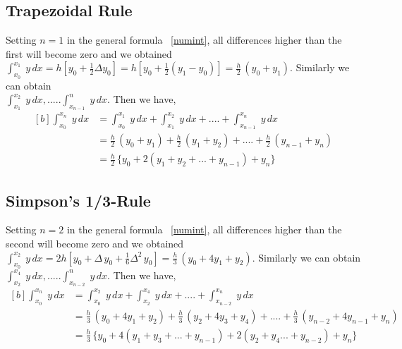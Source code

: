 \documentclass[aima203_lecturenotes_ku.tex]{subfiles}
\begin{document}
\subsection{Trapezoidal Rule}
Setting $n=1$ in the general formula ~\ref{numint}, all differences higher than the first will become zero and we obtained \\[1mm]
$\displaystyle \int_{x_0}^{x_1} \; y\,dx = h \left [ y_0 + \frac{1}{2} \Delta y_0 \right ] = h \left [ y_0 + \frac{1}{2}(y_1 -y_0) \right ] = \frac{h}{2}\, (y_0 + y_1).$ Similarly we can obtain \\[5mm] $\int_{x_1}^{x_2} \; y\,dx, ..... \int_{x_{n-1}}^n \; y\,dx $. Then we have,
\begin{equation}
  \label{trap}
  \begin{aligned}[b]
    \int_{x_0}^{x_n}\; y\,dx &= \int_{x_0}^{x_1} \; y\,dx + \int_{x_1}^{x_2} \; y\,dx + .... + \int_{x_{n-1}}^{x_n} \; y\,dx \\[1mm]
                             &= \frac{h}{2} \, (y_0 + y_1) + \frac{h}{2} \, (y_1 + y_2) + .... + \frac{h}{2} \, (y_{n-1} + y_n) \\[1mm]
                             &= \frac{h}{2} \, \{ y_0 + 2(y_1 + y_2 + ... + y_{n-1}) + y_n \}
  \end{aligned}
\end{equation}

\subsection{Simpson's 1/3-Rule}
Setting $n=2$ in the general formula ~\ref{numint}, all differences higher than the second will become zero and we obtained \\[1mm]
$\displaystyle \int_{x_0}^{x_2} \; y\,dx = 2h \left [ y_0 + \Delta \, y_0 + \frac{1}{6} \Delta^2 \, y_0 \right ] = \frac{h}{3}\, (y_0 + 4y_1 + y_2).$ Similarly we can obtain \\[5mm] $\int_{x_2}^{x_4} \; y\,dx, ..... \int_{x_{n-2}}^n \; y\,dx $. Then we have,
\begin{equation}
  \label{simp1}
  \begin{aligned}[b]
    \int_{x_0}^{x_n}\; y\,dx &= \int_{x_0}^{x_2} \; y\,dx + \int_{x_2}^{x_4} \; y\,dx + .... + \int_{x_{n-2}}^{x_n} \; y\,dx \\[1mm]
                             &= \frac{h}{3} \, (y_0 +4y_1 + y_2) + \frac{h}{3} \, (y_2 + 4y_3 + y_4) + .... + \frac{h}{3} \, (y_{n-2} + 4y_{n-1} + y_n) \\[1mm]
                             &= \frac{h}{3} \, \{ y_0 + 4(y_1 + y_3 + ... + y_{n-1}) + 2 (y_2 + y_4  ... + y_{n-2} ) + y_n \}
  \end{aligned}
\end{equation}
\end{document}
